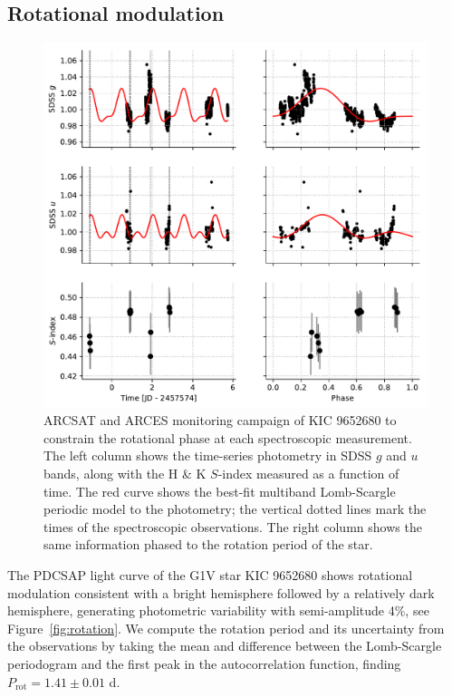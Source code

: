 \subsection{Rotational modulation}

\begin{figure}
    \centering
    \includegraphics[scale=0.9]{nephelion/arcsat.pdf}
    \caption{ARCSAT and ARCES monitoring campaign of KIC 9652680 to constrain the rotational phase at each spectroscopic measurement. The left column shows the time-series photometry in SDSS $g$ and $u$ bands, along with the  H \& K $S$-index measured as a function of time. The red curve shows the best-fit multiband Lomb-Scargle periodic model to the photometry; the vertical dotted lines mark the times of the spectroscopic observations. The right column shows the same information phased to the rotation period of the star.}
    \label{fig:arcsat}
\end{figure}

The \kepler PDCSAP light curve of the G1V star KIC 9652680 shows rotational modulation consistent with a bright hemisphere followed by a relatively dark hemisphere, generating photometric variability with semi-amplitude 4\%, see Figure~\ref{fig:rotation}. We compute the rotation period and its uncertainty from the \kepler observations by taking the mean and difference between the Lomb-Scargle periodogram and the first peak in the autocorrelation function, finding $P_\mathrm{rot} = 1.41 \pm 0.01$ d.

